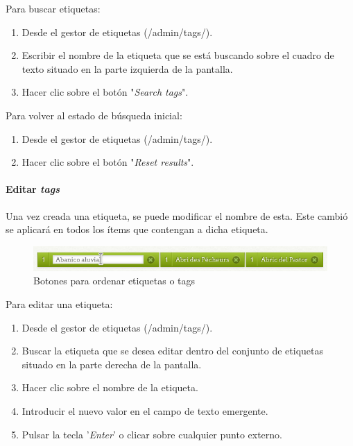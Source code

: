 \documentclass[
]{article}
\providecommand{\tightlist}{%
  \setlength{\itemsep}{0pt}\setlength{\parskip}{0pt}}
\begin{document}
Para buscar etiquetas:

\begin{enumerate}
\def\labelenumi{\arabic{enumi}.}
\tightlist
\item
  Desde el gestor de etiquetas ({/admin/tags/}).
\item
  Escribir el nombre de la etiqueta que se está buscando sobre el cuadro
  de texto situado en la parte izquierda de la pantalla.
\item
  Hacer clic sobre el botón "\emph{Search tags}".
\end{enumerate}

Para volver al estado de búsqueda inicial:

\begin{enumerate}
\def\labelenumi{\arabic{enumi}.}
\tightlist
\item
  Desde el gestor de etiquetas ({/admin/tags/}).
\item
  Hacer clic sobre el botón "\emph{Reset results}".
\end{enumerate}

\hypertarget{editar-tags}{%
\paragraph{\texorpdfstring{Editar
\emph{tags}}{Editar tags}}\label{editar-tags}}

Una vez creada una etiqueta, se puede modificar el nombre de esta. Este
cambió se aplicará en todos los ítems que contengan a dicha etiqueta.

\begin{figure}
\hypertarget{tags-edit}{%
\centering
\includegraphics{../_static/images/tags-edit.png}
\caption{Botones para ordenar etiquetas o tags}\label{tags-edit}
}
\end{figure}

Para editar una etiqueta:

\begin{enumerate}
\def\labelenumi{\arabic{enumi}.}
\tightlist
\item
  Desde el gestor de etiquetas ({/admin/tags/}).
\item
  Buscar la etiqueta que se desea editar dentro del conjunto de
  etiquetas situado en la parte derecha de la pantalla.
\item
  Hacer clic sobre el nombre de la etiqueta.
\item
  Introducir el nuevo valor en el campo de texto emergente.
\item
  Pulsar la tecla '\emph{Enter}' o clicar sobre cualquier punto externo.
\end{enumerate}
\end{document}
